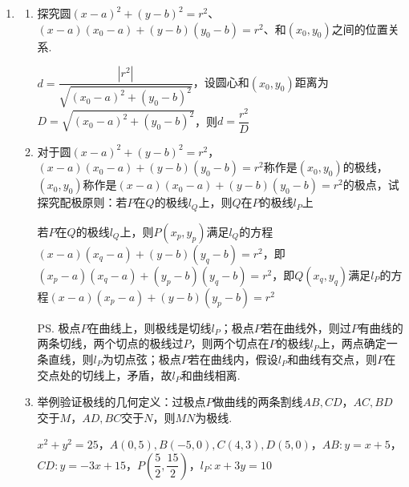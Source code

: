 \begin{enumerate}
\begin{jieda}
\begin{enumerate}
\begin{enumerate}
                设圆心为$O$，直线上的点为$P(x, y)$，设$OH \bot AB$则根据垂径定理有$\vv{OP} \cdot \vv{OM} = \vv{OH} \cdot \vv{OM} = |\vv{OH}| \cdot |\vv{OM}|$. 根据几何关系可知$\triangle OHA \sim \triangle OAM$，因此有$\dfrac{|\vv{OH}|}{|\vv{OA}|} = \dfrac{|\vv{OA}|}{|\vv{OM}|}$，故$\vv{OP} \cdot \vv{OM} = |\vv{OA}|^2$，即$x_0x+y_0y = 4$. 
            \end{enumerate}
            \ps 过$(x_0, y_0)$做$(x-a)^2+(y-b)^2 = r^2$的两切线的切点连线所在直线为$(x-a)(x_0-a) + (y-b)(y_0-b) = r^2$，此弦形式称为“换一半”，在圆锥曲线中也有类似结论. 
        \end{enumerate}
    \end{jieda}
    \item \begin{enumerate}
        \item 探究圆$(x-a)^2+(y-b)^2 = r^2$、$(x-a)(x_0-a) + (y-b)(y_0-b) = r^2$、和$(x_0, y_0)$之间的位置关系.
        \begin{jieda}
            $d = \dfrac{|r^2|}{\sqrt{(x_0-a)^2+(y_0-b)^2}}$，设圆心和$(x_0, y_0)$距离为$D = \sqrt{(x_0-a)^2+(y_0-b)^2}$，则$d = \dfrac{r^2}{D}$
        \end{jieda}
        \item 对于圆$(x-a)^2+(y-b)^2 = r^2$，$(x-a)(x_0-a) + (y-b)(y_0-b) = r^2$称作是$(x_0, y_0)$的极线，$(x_0, y_0)$称作是$(x-a)(x_0-a) + (y-b)(y_0-b) = r^2$的极点，试探究配极原则：若$P$在$Q$的极线$l_Q$上，则$Q$在$P$的极线$l_P$上
        \begin{jieda}
            若$P$在$Q$的极线$l_Q$上，则$P(x_p, y_p)$满足$l_Q$的方程$(x-a)(x_q-a) + (y-b)(y_q-b) = r^2$，即$(x_p-a)(x_q-a) + (y_p-b)(y_q-b) = r^2$，即$Q(x_q, y_q)$满足$l_P$的方程$(x-a)(x_p-a) + (y-b)(y_p-b) = r^2$

            \ps 极点$P$在曲线上，则极线是切线$l_P$；极点$P$若在曲线外，则过$P$有曲线的两条切线，两个切点的极线过$P$，则两个切点在$P$的极线$l_P$上，两点确定一条直线，则$l_P$为切点弦；极点$P$若在曲线内，假设$l_P$和曲线有交点，则$P$在交点处的切线上，矛盾，故$l_P$和曲线相离.
        \end{jieda}
        \item 举例验证极线的几何定义：过极点$P$做曲线的两条割线$AB, CD$，$AC, BD$交于$M$，$AD, BC$交于$N$，则$MN$为极线.
        \begin{jieda}
            $x^2+y^2=25$，$A(0, 5), B(-5, 0), C(4,3), D(5, 0)$，$AB: y = x+5$，$CD: y = -3x+15$，$P\left(\dfrac{5}{2}, \dfrac{15}{2}\right)$，$l_P: x+3y = 10$


\end{jieda}
\end{enumerate}
\end{enumerate}
